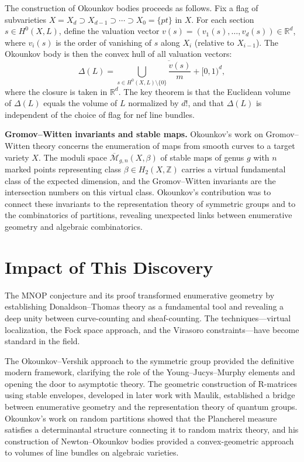 The construction of Okounkov bodies proceeds as follows. Fix a flag of subvarieties $X = X_d \supset X_{d-1} \supset \cdots \supset X_0 = \{pt\}$ in $X$. For each section $s \in H^0(X, L)$, define the valuation vector $v(s) = (v_1(s), \ldots, v_d(s)) \in \mathbb{R}^d$, where $v_i(s)$ is the order of vanishing of $s$ along $X_i$ (relative to $X_{i-1}$). The Okounkov body is then the convex hull of all valuation vectors:
\[
\Delta(L) = \overline{\bigcup_{s \in H^0(X,L) \setminus \{0\}} \frac{v(s)}{m} + [0,1)^d},
\]
where the closure is taken in $\mathbb{R}^d$. The key theorem is that the Euclidean volume of $\Delta(L)$ equals the volume of $L$ normalized by $d!$, and that $\Delta(L)$ is independent of the choice of flag for nef line bundles.

\textbf{Gromov--Witten invariants and stable maps.} Okounkov's work on Gromov--Witten theory concerns the enumeration of maps from smooth curves to a target variety $X$. The moduli space $\overline{\mathcal{M}}_{g,n}(X, \beta)$ of stable maps of genus $g$ with $n$ marked points representing class $\beta \in H_2(X, \mathbb{Z})$ carries a virtual fundamental class of the expected dimension, and the Gromov--Witten invariants are the intersection numbers on this virtual class. Okounkov's contribution was to connect these invariants to the representation theory of symmetric groups and to the combinatorics of partitions, revealing unexpected links between enumerative geometry and algebraic combinatorics.

\section{Impact of This Discovery}

The MNOP conjecture and its proof transformed enumerative geometry by establishing Donaldson--Thomas theory as a fundamental tool and revealing a deep unity between curve-counting and sheaf-counting. The techniques---virtual localization, the Fock space approach, and the Virasoro constraints---have become standard in the field.

The Okounkov--Vershik approach to the symmetric group provided the definitive modern framework, clarifying the role of the Young--Jucys--Murphy elements and opening the door to asymptotic theory. The geometric construction of R-matrices using stable envelopes, developed in later work with Maulik, established a bridge between enumerative geometry and the representation theory of quantum groups. Okounkov's work on random partitions showed that the Plancherel measure satisfies a determinantal structure connecting it to random matrix theory, and his construction of Newton--Okounkov bodies provided a convex-geometric approach to volumes of line bundles on algebraic varieties.

